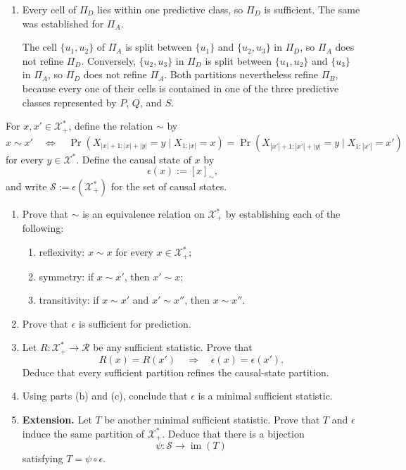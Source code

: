 \begin{solution}[ex:p2-1]
\begin{enumerate}
      \item Every cell of $\Pi_D$ lies within one predictive class, so $\Pi_D$
        is sufficient. The same was established for $\Pi_A$.

        The cell $\{u_1,u_2\}$ of $\Pi_A$ is split between $\{u_1\}$ and
        $\{u_2,u_3\}$ in $\Pi_D$, so $\Pi_A$ does not refine $\Pi_D$.
        Conversely, $\{u_2,u_3\}$ in $\Pi_D$ is split between
        $\{u_1,u_2\}$ and $\{u_3\}$ in $\Pi_A$, so $\Pi_D$ does not refine
        $\Pi_A$. Both partitions nevertheless refine $\Pi_B$, because every
        one of their cells is contained in one of the three predictive classes
        represented by $P$, $Q$, and $S$.
    \end{enumerate}
\end{solution}

\begin{exercise}
\label{ex:p2-2}
  For $x,x'\in\mathcal X_+^*$, define the relation $\sim$ by
  \[
    x\sim x'
    \quad\Longleftrightarrow\quad
    \Pr\!\left(
      X_{|x|+1:|x|+|y|}=y\mid X_{1:|x|}=x
    \right)
    =
    \Pr\!\left(
      X_{|x'|+1:|x'|+|y|}=y\mid X_{1:|x'|}=x'
    \right)
  \]
  for every $y\in\mathcal X^*$. Define the causal state of $x$ by
  \[
    \epsilon(x):=[x]_{\sim},
  \]
  and write $\mathcal S:=\epsilon(\mathcal X_+^*)$ for the set of
  causal states.

  \begin{enumerate}
    \item Prove that $\sim$ is an equivalence relation on
      $\mathcal X_+^*$ by establishing each of the following:
      \begin{enumerate}
        \item reflexivity: $x\sim x$ for every $x\in\mathcal X_+^*$;
        \item symmetry: if $x\sim x'$, then $x'\sim x$;
        \item transitivity: if $x\sim x'$ and $x'\sim x''$, then
          $x\sim x''$.
      \end{enumerate}

    \item Prove that $\epsilon$ is sufficient for prediction.

    \item Let $R:\mathcal X_+^*\to\mathcal R$ be any sufficient statistic.
      Prove that
      \[
        R(x)=R(x')\quad\Longrightarrow\quad
        \epsilon(x)=\epsilon(x').
      \]
      Deduce that every sufficient partition refines the causal-state
      partition.

    \item Using parts (b) and (c), conclude that $\epsilon$ is a minimal
      sufficient statistic.

    \item \textbf{Extension.} Let $T$ be another minimal sufficient
      statistic. Prove that $T$ and $\epsilon$ induce the same partition of
      $\mathcal X_+^*$. Deduce that there is a bijection
      \[
        \psi:\mathcal S\to\operatorname{im}(T)
      \]
      satisfying $T=\psi\circ\epsilon$.
  \end{enumerate}
\end{exercise}
